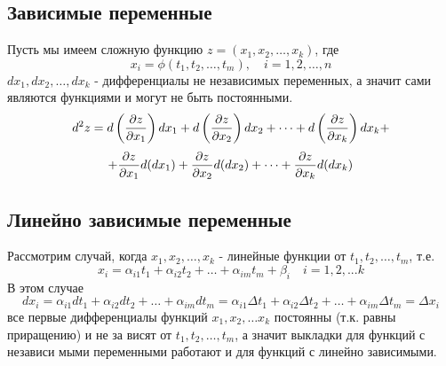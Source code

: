 \subsection{Зависимые переменные}
Пусть мы имеем сложную функцию $z = (x_1, x_2, \dots, x_k)$, где 
$$x_i = \phi(t_1, t_2, \dots, t_m), \quad i = 1, 2, \dots, n$$
$dx_1, dx_2, \dots, dx_k$ - дифференциалы не независимых переменных, а значит сами являются функциями и могут не быть постоянными.
$$d^2z = 
d\left({\partial z \over \partial x_1}\right)dx_1 + 
d\left({\partial z \over \partial x_2}\right)dx_2 + 
\dots +
d\left({\partial z \over \partial x_k}\right)dx_k + 
$$
$$ + 
{\partial z \over \partial x_1}d(dx_1) + 
{\partial z \over \partial x_2}d(dx_2) + 
\dots +
{\partial z \over \partial x_k}d(dx_k)
$$
\subsection{Линейно зависимые переменные}
Рассмотрим случай, когда $x_1, x_2, \dots, x_k$ - линейные
функции от $t_1, t_2, \dots, t_m$, т.е.
$$x_i =
\alpha_{i1}t_1 + 
\alpha_{i2}t_2 + 
\dots +
\alpha_{im}t_m + 
\beta_i
\quad i = 1, 2, ... k$$
В этом случае
$$dx_i = 
\alpha_{i1}dt_1 + 
\alpha_{i2}dt_2 + 
\dots +
\alpha_{im}dt_m
= 
\alpha_{i1}\Delta t_1 + 
\alpha_{i2}\Delta t_2 + 
\dots +
\alpha_{im}\Delta t_m
= \Delta x_i
$$
все первые дифференциалы функций $x_1, x_2, \dots x_k$ постоянны (т.к. равны приращению) и не за
висят от $t_1, t_2, \dots, t_m$, а значит выкладки для функций с независи
мыми переменными работают и для функций с линейно зависимыми.
